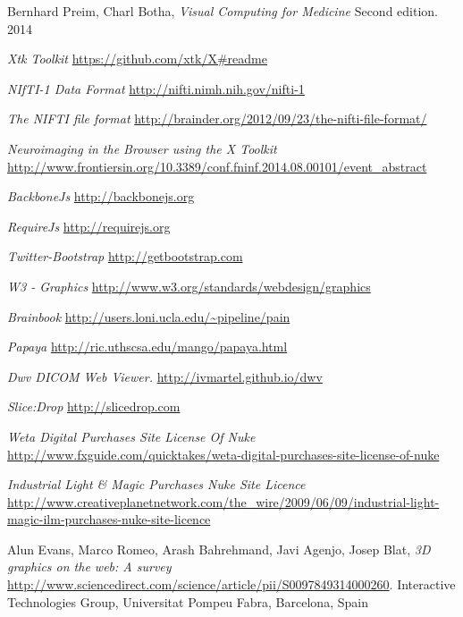 \documentclass[a4paper,11pt,titlepage]{article}
\begin{document}
  \begin{thebibliography}{1}

   Bernhard Preim, Charl Botha, {\em Visual Computing for Medicine} Second edition. 2014
  
    {\em Xtk Toolkit } \url{https://github.com/xtk/X#readme}
   
      {\em NIfTI-1 Data Format} \url{http://nifti.nimh.nih.gov/nifti-1}
     
	 {\em The NIFTI file format} \url{http://brainder.org/2012/09/23/the-nifti-file-format/} 
   
       {\em Neuroimaging in the Browser using the X Toolkit } \url{http://www.frontiersin.org/10.3389/conf.fninf.2014.08.00101/event_abstract} 

   {\em BackboneJs } \url{http://backbonejs.org} 
  
   {\em RequireJs } \url{http://requirejs.org} 
  
   {\em Twitter-Bootstrap } \url{http://getbootstrap.com} 	
  
   {\em W3 - Graphics } \url{http://www.w3.org/standards/webdesign/graphics}
  
   {\em Brainbook } \url{http://users.loni.ucla.edu/~pipeline/pain} 
  
   {\em Papaya } \url{http://ric.uthscsa.edu/mango/papaya.html} 
  
     {\em Dwv DICOM Web Viewer. } \url{http://ivmartel.github.io/dwv} 

     {\em Slice:Drop} \url{http://slicedrop.com} 
    
  
    
   {\em Weta Digital Purchases Site License Of Nuke } \url{http://www.fxguide.com/quicktakes/weta-digital-purchases-site-license-of-nuke} 
        
   {\em Industrial Light \& Magic Purchases Nuke Site Licence } \url{http://www.creativeplanetnetwork.com/the_wire/2009/06/09/industrial-light-magic-ilm-purchases-nuke-site-licence} 

     Alun Evans, Marco Romeo, Arash Bahrehmand, Javi Agenjo, Josep Blat, {\em 3D graphics on the web: A survey } \url{http://www.sciencedirect.com/science/article/pii/S0097849314000260}. Interactive Technologies Group, Universitat Pompeu Fabra, Barcelona, Spain


  \end{thebibliography}
\end{document}

